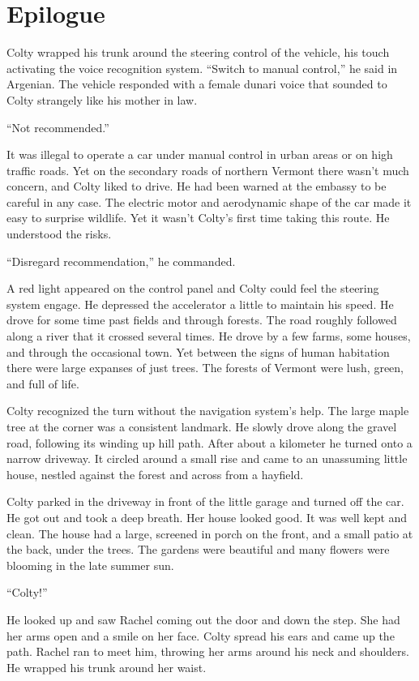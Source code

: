 
\chapter*{Epilogue}

Colty wrapped his trunk around the steering control of the vehicle, his touch activating the
voice recognition system. ``Switch to manual control,'' he said in Argenian. The vehicle
responded with a female dunari voice that sounded to Colty strangely like his mother in law.

``Not recommended.''

It was illegal to operate a car under manual control in urban areas or on high traffic roads.
Yet on the secondary roads of northern Vermont there wasn't much concern, and Colty liked to
drive. He had been warned at the embassy to be careful in any case. The electric motor and
aerodynamic shape of the car made it easy to surprise wildlife. Yet it wasn't Colty's first time
taking this route. He understood the risks.

``Disregard recommendation,'' he commanded.

A red light appeared on the control panel and Colty could feel the steering system engage. He
depressed the accelerator a little to maintain his speed. He drove for some time past fields and
through forests. The road roughly followed along a river that it crossed several times. He drove
by a few farms, some houses, and through the occasional town. Yet between the signs of human
habitation there were large expanses of just trees. The forests of Vermont were lush, green, and
full of life.

Colty recognized the turn without the navigation system's help. The large maple tree at the
corner was a consistent landmark. He slowly drove along the gravel road, following its winding
up hill path. After about a kilometer he turned onto a narrow driveway. It circled around a
small rise and came to an unassuming little house, nestled against the forest and across from a
hayfield.

Colty parked in the driveway in front of the little garage and turned off the car. He got out
and took a deep breath. Her house looked good. It was well kept and clean. The house had a
large, screened in porch on the front, and a small patio at the back, under the trees. The
gardens were beautiful and many flowers were blooming in the late summer sun.

``Colty!''

He looked up and saw Rachel coming out the door and down the step. She had her arms open and a
smile on her face. Colty spread his ears and came up the path. Rachel ran to meet him, throwing
her arms around his neck and shoulders. He wrapped his trunk around her waist.


